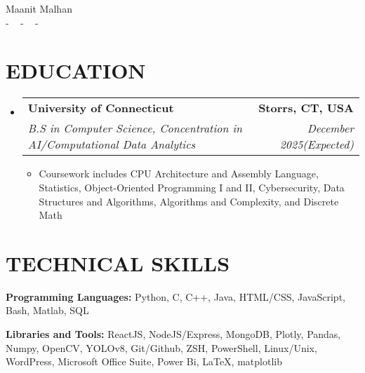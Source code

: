 \documentclass[letterpaper,11pt]{article}
\makeatletter
\newcommand{\resumeItem}[1]{
  \item\small{
    {#1 \vspace{-1pt}}
  }
}
\newcommand{\resumeSubheading}[4]{
  \vspace{-2pt}\item
    \begin{tabular*}{1.0\textwidth}[t]{l@{\extracolsep{\fill}}r}
      \textbf{\large#1} & \textbf{\small #2} \\
      \textit{\large#3} & \textit{\small #4} \\
      
    \end{tabular*}\vspace{-7pt}
}
\newcommand{\resumeSubHeadingListStart}{\begin{itemize}[leftmargin=0.0in, label={}]}
\newcommand{\resumeSubHeadingListEnd}{\end{itemize}}
\newcommand{\resumeItemListStart}{\begin{itemize}[leftmargin=0.1in]}
\newcommand{\resumeItemListEnd}{\end{itemize}\vspace{-5pt}}
\makeatother
\begin{document}


\begin{center}
    {\huge Maanit Malhan} \\ \vspace{2pt} 
    \small{-}
    \href{mailto:[maanitmalhan@gmail.com]}{\color{blue}{maanitmalhan@gmail.com}} ~ 
    \small{-}
    \href{[https://www.linkedin.com/in/maanit-malhan/]}{ \color{blue}{https://www.linkedin.com/in/maanit-malhan}}  ~
    \small{-}
    \href{[Maanit Malhan]}{ \color{blue}{https://github.com/maanitmalhan}} ~
    \vspace{-7pt}
\end{center}

\section{\color{airforceblue}EDUCATION}
  \resumeSubHeadingListStart
    \resumeSubheading
      {University of Connecticut}{Storrs, CT, USA}
      {B.S in Computer Science, Concentration in AI/Computational Data Analytics}{December 2025(Expected)}
       \resumeItemListStart
            \resumeItem{\normalsize{Coursework includes CPU Architecture and Assembly Language, Statistics, Object-Oriented Programming I and II, Cybersecurity, Data Structures and Algorithms, Algorithms and Complexity, and Discrete Math}}
            
      \resumeItemListEnd  
    \vspace{-4pt}
     
  \resumeSubHeadingListEnd
  \vspace{-10pt}

\section{\color{airforceblue}TECHNICAL SKILLS}
 \begin{itemize}[leftmargin=0in, label={}]
    \small{\item{
     \textbf{\normalsize{Programming Languages:}}{ \normalsize{Python, C, C++, Java, HTML/CSS, JavaScript, Bash, Matlab, SQL}} \\
      \vspace{1.2pt}
      
     \textbf{\normalsize{Libraries and Tools:}}{ \normalsize{ReactJS, NodeJS/Express, MongoDB, Plotly, Pandas, Numpy, OpenCV, YOLOv8, Git/Github, ZSH, PowerShell, Linux/Unix, WordPress, Microsoft Office Suite, Power Bi, LaTeX, matplotlib}} \\
      \vspace{1.2pt}
      
     
     }}
 \end{itemize}
 \vspace{-16pt}
 
\end{document}

